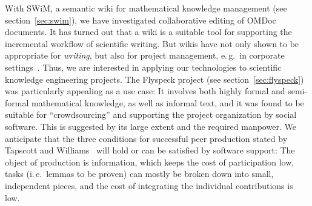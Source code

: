 With SWiM, a semantic wiki for mathematical knowledge management (see
section~\ref{sec:swim}), we have investigated collaborative editing of OMDoc documents.  It
has turned out that a wiki is a suitable tool for supporting the incremental workflow of
scientific writing.  But wikis have not only shown to be appropriate for \emph{writing},
but also for project management, e.\,g.\ in corporate settings~\cite{leuf01:wikiway}.
Thus, we are interested in applying our technologies to scientific knowledge engineering
projects.  The Flyspeck project (see section~\ref{sec:flyspeck}) was particularly
appealing as a use case: It involves both highly formal and semi-formal mathematical
knowledge, as well as informal text, and it was found  to be suitable for ``crowdsourcing''
and supporting the project organization by social software.  This is suggested by its
large extent and the required manpower.  We anticipate that the three conditions for
successful peer production stated by Tapscott and Williams~\cite{wikinomics} will hold or
can be satisfied by software support: The object of production is information, which keeps
the cost of participation low, tasks (i.\,e.\ lemmas to be proven) can mostly be broken
down into small, independent pieces, and the cost of integrating the individual
contributions is low.

